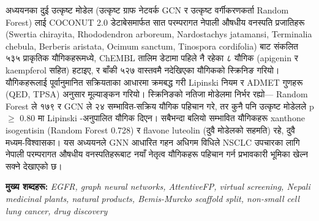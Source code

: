 {\vspace{0.3em}

{\nepalifont अध्ययनका दुई उत्कृष्ट मोडेल (उत्कृष्ट ग्राफ नेटवर्क}
GCN
{\nepalifont र उत्कृष्ट वर्गीकरणकर्ता}
Random Forest)
{\nepalifont लाई}
COCONUT 2.0
{\nepalifont डेटाबेसमार्फत सात परम्परागत नेपाली औषधीय वनस्पति
प्रजातिहरू}
(Swertia chirayita, Rhododendron arboreum, Nardostachys
jatamansi, Terminalia chebula, Berberis aristata, Ocimum sanctum,
Tinospora cordifolia)
{\nepalifont बाट संकलित ५३५ प्राकृतिक यौगिकहरूमध्ये,}
ChEMBL
{\nepalifont तालिम डेटामा पहिले नै रहेका ८ यौगिक (}apigenin
{\nepalifont र}
kaempferol
{\nepalifont सहित) हटाइए, र बाँकी ५२७ वास्तवमै नदेखिएका यौगिकको
स्क्रिनिङ गरियो। यौगिकहरूलाई पूर्वानुमानित सक्रियताका आधारमा
क्रमबद्ध गरी}
Lipinski
{\nepalifont नियम र}
ADMET
{\nepalifont गुणहरू}
(QED, TPSA)
{\nepalifont अनुसार मूल्याङ्कन गरियो। स्क्रिनिङको नतिजा मोडेलमा
निर्भर रह्यो---}
Random Forest
{\nepalifont ले १७९ र}
GCN
{\nepalifont ले २४ सम्भावित-सक्रिय यौगिक पहिचान गरे, तर कुनै पनि
उत्कृष्ट मोडेलले}
p $\geq$ 0.80
{\nepalifont मा}
Lipinski
{\nepalifont-अनुपालित यौगिक दिएन। सबैभन्दा बलियो सम्भावित यौगिकहरू
xanthone}
isogentisin
(Random Forest 0.728)
{\nepalifont र flavone}
luteolin
{\nepalifont (दुवै मोडेलको सहमति) रहे, दुवै मध्यम-विश्वासका।}
{\nepalifont यस अध्ययनले}
GNN
{\nepalifont आधारित गहन अधिगम विधिले}
NSCLC
{\nepalifont उपचारका लागि नेपाली परम्परागत औषधीय वनस्पतिहरूबाट
नयाँ नेतृत्व यौगिकहरू पहिचान गर्न प्रभावकारी भूमिका खेल्न सक्ने
देखाएको छ।}

} %

\vspace{0.8cm}

\noindent
{\fontsize{12}{18}\selectfont
{\nepalifont\textbf{मुख्य शब्दहरू:}}
\textit{EGFR,
graph neural networks, AttentiveFP,
virtual screening, Nepali medicinal plants,
natural products, Bemis-Murcko scaffold split,
non-small cell lung cancer, drug discovery}}